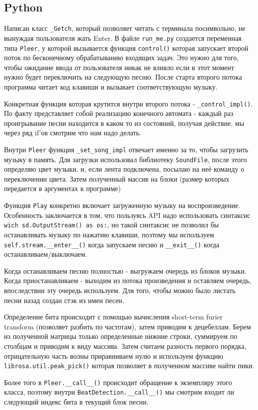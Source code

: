 \subsection*{Python}
Написан класс \verb|_Getch|, который позволяет читать с терминала посимвольно, не вынуждая пользователя жать Enter. В файле \verb|run_me.py| создается переменная типа \verb|Pleer|, у которой вызывается функция \verb|control()| которая запускает второй поток по бесконечному обрабатыванию входящих задач. Это нужно для того, чтобы ожидание ввода от пользователя никак не влияло если в этот момент нужно будет переключить на следующую песню. После старта второго потока программа читает код клавиши и вызывает соответствующую музыку.
\par Конкретная функция которая крутится внутри второго потока - \verb|_control_impl()|. По факту представляет собой реализацию конечного автомата - каждый раз проигрывание песни находится в каком то из состояний, получая действие, мы через ряд if'ов смотрим что нам надо делать.
\par Внутри \verb|Pleer| функция \verb|_set_song_impl| отвечает именно за то, чтобы загрузить музыку в память. Для загрузки использовал библиотеку \verb|SoundFile|, после этого определяю цвет музыки, и, если лента подключена, посылаю на неё команду о переключении цвета. Затем полученный массив на блоки (размер которых передается в аргументах к программе)
\par Функция \verb|Play| конкретно включает загруженную музыку на
воспроизведение. Особенность заключается в том, что пользуясь API надо
использовать синтаксис \verb|wich sd.OutputStream() as os:|, но такой синтаксис не позволил бы останавливать музыку по нажатию клавиши, поэтому мы используем \verb|self.stream.__enter__()| когда запускаем песню и \verb|__exit__()| когда останавливаем/выключаем.
\par Когда останавливаем песню полностью - выгружаем очередь из блоков музыки. Когда приостанавливаем - выходим из потока произведения и оставляем очередь, впоследствии эту очередь используем. Для того, чтобы можно было листать песни назад создан стэк из имен песен.
\par Определение бита происходит с помощью вычисления short-term furier transform (позволяет разбить по частотам), затем приводим к децебеллам. Берем из полученной матрицы только определенные нижние строки, суммируем по столбцам и приводим к виду массива. Затем считаем разность первого порядка, отрицательную часть волны приравниваем нулю и используем функцию \verb|librosa.util.peak_pick()| которая позволяет в полученном массиве найти пики.
\par Более того в \verb|Pleer.__call__()| происходит обращение к экземпляру этого класса, поэтому внутри \verb|BeatDetection.__call__()| мы смотрим входит ли следующий индекс бита в текущий блок песни.


